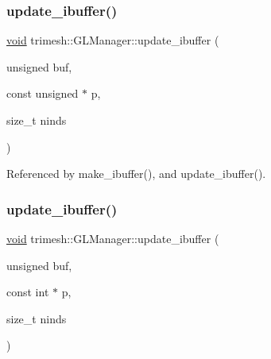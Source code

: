 \subsubsection{\texorpdfstring{update\+\_\+ibuffer()}{update\_ibuffer()}\hspace{0.1cm}{\footnotesize\ttfamily [1/3]}}
{\footnotesize\ttfamily \hyperlink{namespacetrimesh_a784ddfd979e1c579bda795a8edfc3f43}{void} trimesh\+::\+G\+L\+Manager\+::update\+\_\+ibuffer (\begin{DoxyParamCaption}\item[{unsigned}]{buf,  }\item[{const unsigned $\ast$}]{p,  }\item[{size\+\_\+t}]{ninds }\end{DoxyParamCaption})}



Referenced by make\+\_\+ibuffer(), and update\+\_\+ibuffer().

\mbox{\label{classtrimesh_1_1GLManager_aa18449c5b67746b795a1ff500f60b402}} 
\subsubsection{\texorpdfstring{update\+\_\+ibuffer()}{update\_ibuffer()}\hspace{0.1cm}{\footnotesize\ttfamily [2/3]}}
{\footnotesize\ttfamily \hyperlink{namespacetrimesh_a784ddfd979e1c579bda795a8edfc3f43}{void} trimesh\+::\+G\+L\+Manager\+::update\+\_\+ibuffer (\begin{DoxyParamCaption}\item[{unsigned}]{buf,  }\item[{const int $\ast$}]{p,  }\item[{size\+\_\+t}]{ninds }\end{DoxyParamCaption})\hspace{0.3cm}{\ttfamily [inline]}}

\mbox{\label{classtrimesh_1_1GLManager_a19b3916af0c43804c19a9ad51ec19d00}} 
